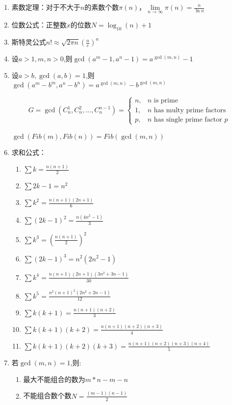 \documentclass[twoside]{article}
\begin{document}
\begin{enumerate}
\item 素数定理：对于不大于$n$的素数个数$\pi(n)$，$\lim\limits_{n\to\infty}\pi(n)=\frac{n}{\ln n}$

\item 位数公式：正整数$x$的位数$N=\log_{10}(n)+1$

\item 斯特灵公式$n!\approx\sqrt{2\pi n}(\frac{n}{e})^n$

\item 设$a>1,m,n>0$,则$\gcd(a^m-1,a^n-1)=a^{\gcd(m,n)}-1$

\item 设$a>b,\gcd(a,b)=1$,则$\gcd(a^m-b^m,a^n-b^n)=a^{\gcd(m,n)}-b^{\gcd(m,n)}$

$$
G=\gcd(C_n^1,C_n^2,...,C_n^{n-1})=
\begin{cases}
	n, & \text{$n$ is prime} \\
	1, & \text{$n$ has multy prime factors} \\
	p, & \text{$n$ has single prime factor $p$}
\end{cases}
$$

$\gcd(Fib(m),Fib(n))=Fib(\gcd(m,n))$

\item 求和公式：

\begin{enumerate}
\item $\sum k=\frac{n(n+1)}{2}$
\item $\sum 2k-1=n^2$
\item $\sum k^2=\frac{n(n+1)(2n+1)}{6}$
\item $\sum (2k-1)^2=\frac{n(4n^2-1)}{3}$
\item $\sum k^3=(\frac{n(n+1)}{2})^2$
\item $\sum (2k-1)^3=n^2(2n^2-1)$
\item $\sum k^4=\frac{n(n+1)(2n+1)(3n^2+3n-1)}{30}$
\item $\sum k^5=\frac{n^2(n+1)^2(2n^2+2n-1)}{12}$
\item $\sum k(k+1)=\frac{n(n+1)(n+2)}{3}$
\item $\sum k(k+1)(k+2)=\frac{n(n+1)(n+2)(n+3)}{4}$
\item $\sum k(k+1)(k+2)(k+3)=\frac{n(n+1)(n+2)(n+3)(n+4)}{5}$
\end{enumerate}

\item 若$\gcd(m,n)=1$,则:

\begin{enumerate}
\item 最大不能组合的数为$m*n-m-n$
\item 不能组合数个数$N=\frac{(m-1)(n-1)}{2}$
\end{enumerate}


\end{enumerate}
\end{document}
